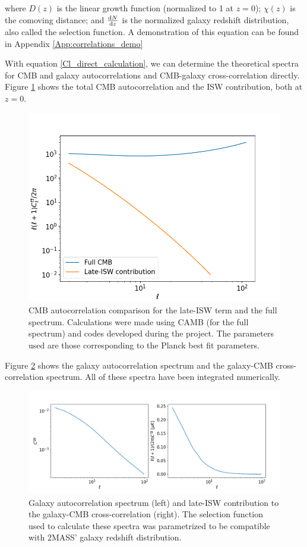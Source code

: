 \documentclass[openany,a4paper,12pt,oneside]{book}
\begin{document}
\begin{spacing}{1.5}
\noindent where $D(z)$ is the linear growth function (normalized to 1 at $z=0$); $\chi(z)$ is the comoving distance; and $\dv{N}{z}$ is the normalized galaxy redshift distribution, also called the selection function\cite{cross_corr:Afshordi}. A demonstration of this equation can be found in Appendix \ref{App:correlations_demo}

With equation \eqref{Cl_direct_calculation}, we can determine the theoretical spectra for CMB and galaxy autocorrelations and CMB-galaxy cross-correlation directly. Figure \ref{fig:Ctt_ISW_comparison} shows the total CMB autocorrelation and the ISW contribution, both at $z=0$.

\begin{figure}[!htb]
    \centering
    \includegraphics[width=.75\linewidth]{Imagens/Ctt_comparison.png}
	\caption{CMB autocorrelation comparison for the late-ISW term and the full spectrum. Calculations were made using CAMB (for the full spectrum) and codes developed during the project. The parameters used are those corresponding to the Planck best fit parameters\cite{Planck_results}.}
    \label{fig:Ctt_ISW_comparison}
\end{figure}

Figure \ref{fig:correlations_theoretical} shows the galaxy autocorrelation spectrum and the galaxy-CMB cross-correlation spectrum. All of these spectra have been integrated numerically.

\begin{figure}[!htb]
	\centering
	\includegraphics[width=.98\linewidth]{Imagens/Correlations_DoublePlot.png}
	\caption{Galaxy autocorrelation spectrum (left) and late-ISW contribution to the galaxy-CMB cross-correlation (right). The selection function used to calculate these spectra was parametrized to be compatible with 2MASS' galaxy redshift distribution\cite{cross_corr:Afshordi, Moura-Santos_2016}.}
	\label{fig:correlations_theoretical}
\end{figure}


\end{spacing}
\end{document}

